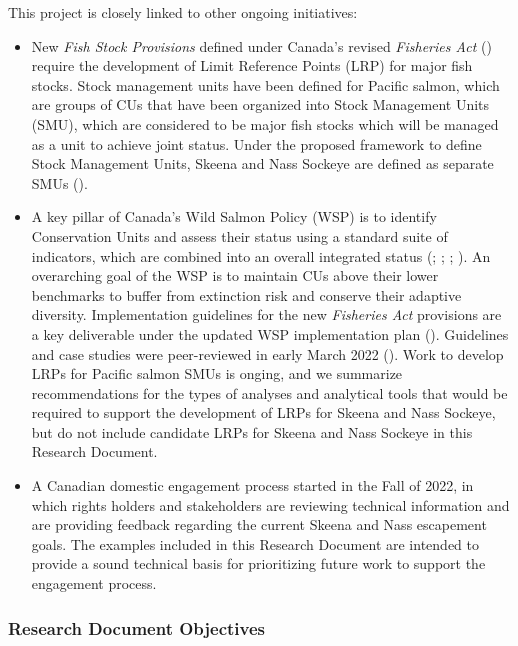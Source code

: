 \documentclass[french,11pt]{book}
\begin{document}
This project is closely linked to other ongoing initiatives:
\begin{itemize}
\item
  New \emph{Fish Stock Provisions} defined under Canada's revised \emph{Fisheries Act} () require the development of Limit Reference Points (LRP) for major fish stocks. Stock management units have been defined for Pacific salmon, which are groups of CUs that have been organized into Stock Management Units (SMU), which are considered to be major fish stocks which will be managed as a unit to achieve joint status. Under the proposed framework to define Stock Management Units, Skeena and Nass Sockeye are defined as separate SMUs ().
\item
  A key pillar of Canada's Wild Salmon Policy (WSP) is to identify Conservation Units and assess their status using a standard suite of indicators, which are combined into an overall integrated status (; ; ; ). An overarching goal of the WSP is to maintain CUs above their lower benchmarks to buffer from extinction risk and conserve their adaptive diversity. Implementation guidelines for the new \emph{Fisheries Act} provisions are a key deliverable under the updated WSP implementation plan (). Guidelines and case studies were peer-reviewed in early March 2022 (). Work to develop LRPs for Pacific salmon SMUs is onging, and we summarize recommendations for the types of analyses and analytical tools that would be required to support the development of LRPs for Skeena and Nass Sockeye, but do not include candidate LRPs for Skeena and Nass Sockeye in this Research Document.
\item
  A Canadian domestic engagement process started in the Fall of 2022, in which rights holders and stakeholders are reviewing technical information and are providing feedback regarding the current Skeena and Nass escapement goals. The examples included in this Research Document are intended to provide a sound technical basis for prioritizing future work to support the engagement process.
\end{itemize}
\subsubsection{Research Document Objectives}\label{PaperObj}
\end{document}
